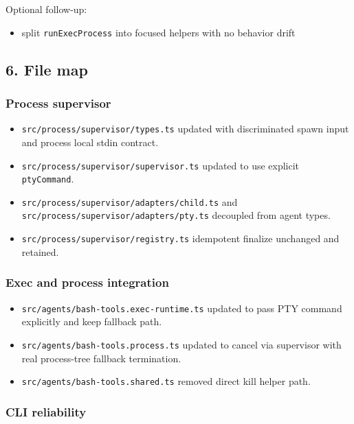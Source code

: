 Optional follow-up:

\begin{itemize}
  \item split \texttt{runExecProcess} into focused helpers with no behavior drift
\end{itemize}


\subsection{6. File map}


\subsubsection{Process supervisor}


\begin{itemize}
  \item \texttt{src/process/supervisor/types.ts} updated with discriminated spawn input and process local stdin contract.
  \item \texttt{src/process/supervisor/supervisor.ts} updated to use explicit \texttt{ptyCommand}.
  \item \texttt{src/process/supervisor/adapters/child.ts} and \texttt{src/process/supervisor/adapters/pty.ts} decoupled from agent types.
  \item \texttt{src/process/supervisor/registry.ts} idempotent finalize unchanged and retained.
\end{itemize}


\subsubsection{Exec and process integration}


\begin{itemize}
  \item \texttt{src/agents/bash-tools.exec-runtime.ts} updated to pass PTY command explicitly and keep fallback path.
  \item \texttt{src/agents/bash-tools.process.ts} updated to cancel via supervisor with real process-tree fallback termination.
  \item \texttt{src/agents/bash-tools.shared.ts} removed direct kill helper path.
\end{itemize}


\subsubsection{CLI reliability}


